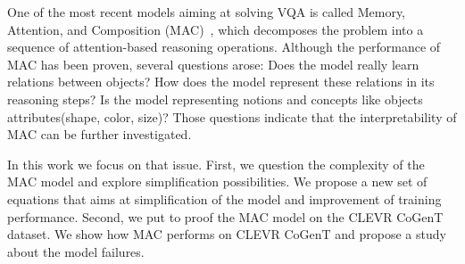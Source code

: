 One of the most recent models aiming at solving VQA is called Memory, Attention, and Composition (MAC)~\citep{hudson2018compositional}, which decomposes the problem into a sequence of attention-based reasoning operations. 
Although the performance of MAC has been proven, 
several questions arose:
Does the model really learn relations between objects? 
How does the model represent these relations in its reasoning steps? 
Is the model representing notions and concepts like objects attributes(shape, color, size)?
Those questions indicate that the interpretability of MAC can be further investigated.

In this work we focus on that issue.
First, we question the complexity of the MAC model and explore simplification possibilities. We propose a new set of equations that aims at simplification of the model and improvement of training performance. 
Second, we put to proof the MAC model on the CLEVR CoGenT dataset. 
We show how MAC performs on CLEVR CoGenT and propose a study about the model failures.
